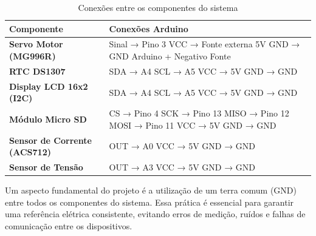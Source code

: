 \begin{table}[H]
\centering
\caption{Conexões entre os componentes do sistema}
\label{tab:conexoes}
\renewcommand{\arraystretch}{1.3}
\begin{tabular}{|p{4.5cm}|p{9cm}|}
\hline
\textbf{Componente} & \textbf{Conexões Arduino} \\
\hline

\textbf{Servo Motor (MG996R)} & 
Sinal → Pino 3 \newline
VCC → Fonte externa 5V \newline
GND → GND Arduino + Negativo Fonte \\
\hline

\textbf{RTC DS1307} & 
SDA → A4 \newline
SCL → A5 \newline
VCC → 5V \newline
GND → GND \\
\hline

\textbf{Display LCD 16x2 (I2C)} & 
SDA → A4 \newline
SCL → A5 \newline
VCC → 5V \newline
GND → GND \\
\hline

\textbf{Módulo Micro SD} & 
CS → Pino 4 \newline
SCK → Pino 13 \newline
MISO → Pino 12 \newline
MOSI → Pino 11 \newline
VCC → 5V \newline
GND → GND \\
\hline

\textbf{Sensor de Corrente (ACS712)} & 
OUT → A0 \newline
VCC → 5V \newline
GND → GND \\
\hline

\textbf{Sensor de Tensão} & 
OUT → A3 \newline
VCC → 5V \newline
GND → GND \\
\hline

\end{tabular}
\end{table}

Um aspecto fundamental do projeto é a utilização de um terra comum (GND) entre todos os componentes do sistema. Essa prática é essencial para garantir uma referência elétrica consistente, evitando erros de medição, ruídos e falhas de comunicação entre os dispositivos.

